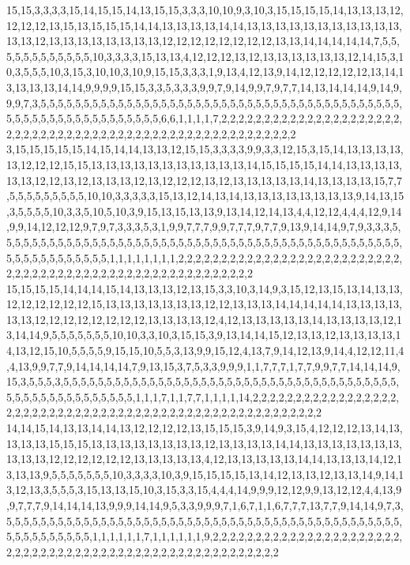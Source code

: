 15,15,3,3,3,3,15,14,15,15,14,13,15,15,3,3,3,10,10,9,3,10,3,15,15,15,15,14,13,13,13,12,12,12,12,13,15,13,15,15,15,14,14,13,13,13,13,14,14,13,13,13,13,13,13,13,13,13,13,13,13,13,12,13,13,13,13,13,13,13,13,12,12,12,12,12,12,12,12,13,13,14,14,14,14,14,7,5,5,5,5,5,5,5,5,5,5,5,5,10,3,3,3,3,15,13,13,4,12,12,12,13,12,13,13,13,13,13,13,12,14,15,3,10,3,5,5,5,10,3,15,3,10,10,3,10,9,15,15,3,3,3,1,9,13,4,12,13,9,14,12,12,12,12,12,13,14,13,13,13,13,14,14,9,9,9,9,15,15,3,3,5,3,3,3,9,9,7,9,14,9,9,7,9,7,7,14,13,14,14,14,9,14,9,9,9,7,3,5,5,5,5,5,5,5,5,5,5,5,5,5,5,5,5,5,5,5,5,5,5,5,5,5,5,5,5,5,5,5,5,5,5,5,5,5,5,5,5,5,5,5,5,5,5,5,5,5,5,5,5,5,5,5,5,5,5,5,5,6,6,1,1,1,1,7,2,2,2,2,2,2,2,2,2,2,2,2,2,2,2,2,2,2,2,2,2,2,2,2,2,2,2,2,2,2,2,2,2,2,2,2,2,2,2,2,2,2,2,2,2,2,2,2,2,2,2,2,2,2,2
3,15,15,15,15,15,14,15,14,14,13,13,12,15,15,3,3,3,3,9,9,3,3,12,15,3,15,14,13,13,13,13,13,12,12,12,15,15,13,13,13,13,13,13,13,13,13,13,13,14,15,15,15,15,14,14,13,13,13,13,13,13,12,12,13,12,13,13,13,12,13,12,12,12,13,12,13,13,13,13,13,14,13,13,13,13,15,7,7,5,5,5,5,5,5,5,5,5,10,10,3,3,3,3,3,15,13,12,14,13,14,13,13,13,13,13,13,13,13,9,14,13,15,3,5,5,5,5,10,3,3,5,10,5,10,3,9,15,13,15,13,13,9,13,14,12,14,13,4,4,12,12,4,4,4,12,9,14,9,9,14,12,12,12,9,7,9,7,3,3,3,5,3,1,9,9,7,7,7,9,9,7,7,7,9,7,7,9,13,9,14,14,9,7,9,3,3,3,5,5,5,5,5,5,5,5,5,5,5,5,5,5,5,5,5,5,5,5,5,5,5,5,5,5,5,5,5,5,5,5,5,5,5,5,5,5,5,5,5,5,5,5,5,5,5,5,5,5,5,5,5,5,5,5,5,5,5,1,1,1,1,1,1,1,1,2,2,2,2,2,2,2,2,2,2,2,2,2,2,2,2,2,2,2,2,2,2,2,2,2,2,2,2,2,2,2,2,2,2,2,2,2,2,2,2,2,2,2,2,2,2,2,2,2,2,2,2,2,2,2
15,15,15,15,14,14,14,15,14,13,13,13,12,13,15,3,3,10,3,14,9,3,15,12,13,15,13,14,13,13,12,12,12,12,12,12,15,13,13,13,13,13,13,13,12,12,13,13,13,14,14,14,14,14,13,13,13,13,13,13,12,12,12,12,12,12,12,12,13,13,13,13,12,4,12,13,13,13,13,13,14,13,13,13,13,12,13,14,14,9,5,5,5,5,5,5,5,10,10,3,3,10,3,15,15,3,9,13,14,14,15,12,13,13,12,13,13,13,13,14,13,12,15,10,5,5,5,5,9,15,15,10,5,5,3,13,9,9,15,12,4,13,7,9,14,12,13,9,14,4,12,12,11,4,4,13,9,9,7,7,9,14,14,14,14,7,9,13,15,3,7,5,3,3,9,9,9,1,1,7,7,7,1,7,7,9,9,7,7,14,14,14,9,15,3,5,5,5,3,5,5,5,5,5,5,5,5,5,5,5,5,5,5,5,5,5,5,5,5,5,5,5,5,5,5,5,5,5,5,5,5,5,5,5,5,5,5,5,5,5,5,5,5,5,5,5,5,5,5,5,5,5,5,1,1,1,7,1,1,7,7,1,1,1,1,14,2,2,2,2,2,2,2,2,2,2,2,2,2,2,2,2,2,2,2,2,2,2,2,2,2,2,2,2,2,2,2,2,2,2,2,2,2,2,2,2,2,2,2,2,2,2,2,2,2,2,2,2,2,2
14,14,15,14,13,13,14,14,13,12,12,12,12,13,15,15,15,3,9,14,9,3,15,4,12,12,12,13,14,13,13,13,13,15,15,15,13,13,13,13,13,13,13,13,12,13,13,13,13,14,14,13,13,13,13,13,13,13,13,13,13,12,12,12,12,12,12,13,13,13,13,13,4,12,13,13,13,13,13,14,14,13,13,13,14,12,13,13,13,9,5,5,5,5,5,5,5,10,3,3,3,3,10,3,9,15,15,15,15,13,14,12,13,13,12,13,13,14,9,14,13,12,13,3,5,5,5,3,15,13,13,15,10,3,15,3,3,15,4,4,4,14,9,9,9,12,12,9,9,13,12,12,4,4,13,9,9,7,7,7,9,14,14,14,13,9,9,9,14,14,9,5,3,3,9,9,9,7,1,6,7,1,1,6,7,7,7,13,7,7,9,14,14,9,7,3,5,5,5,5,5,5,5,5,5,5,5,5,5,5,5,5,5,5,5,5,5,5,5,5,5,5,5,5,5,5,5,5,5,5,5,5,5,5,5,5,5,5,5,5,5,5,5,5,5,5,5,5,5,5,5,5,1,1,1,1,1,1,7,1,1,1,1,1,1,9,2,2,2,2,2,2,2,2,2,2,2,2,2,2,2,2,2,2,2,2,2,2,2,2,2,2,2,2,2,2,2,2,2,2,2,2,2,2,2,2,2,2,2,2,2,2,2,2,2,2,2,2,2,2
